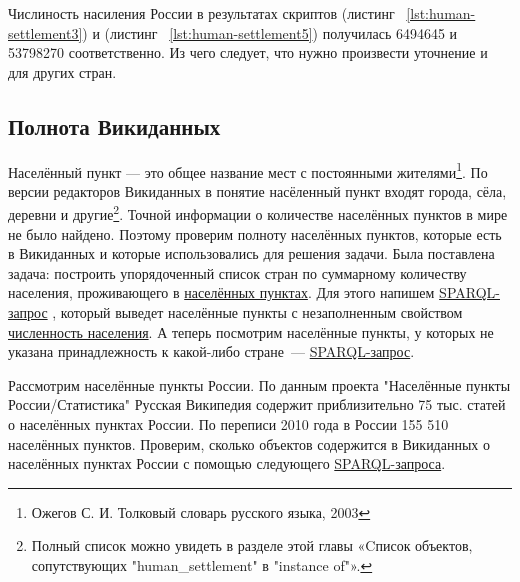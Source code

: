 Числиность насиления России в результатах скриптов (листинг ~\protect\ref{lst:human-settlement3}) и (листинг ~\protect\ref{lst:human-settlement5}) получилась \num{6494645} и \num{53798270} соответственно. Из чего следует, что нужно произвести уточнение и для других стран.

 


\subsection{Полнота Викиданных}

Населённый пункт — это общее название мест с постоянными жителями\footnote {Ожегов С. И. Толковый словарь русского языка, 2003}. По версии редакторов Викиданных в понятие насёленный пункт входят города, сёла, деревни и другие\footnote{Полный список можно увидеть в разделе этой главы «Cписок объектов, сопутствующих "human\_settlement" в "instance of"».}.
Точной информации о количестве населённых пунктов в мире не было найдено. Поэтому проверим полноту населённых пунктов, которые есть в Викиданных и которые использовались для решения задачи. Была поставлена задача: построить упорядоченный список стран по суммарному количеству населения, проживающего в \href{http://www.wikidata.org/entity/Q486972}{населённых пунктах}. Для этого напишем \href{https://w.wiki/4FUz}{SPARQL-запрос} \footnotemark, который выведет населённые пункты с незаполненным свойством \href{http://www.wikidata.org/entity/P1082}{численность населения}. 
А теперь посмотрим населённые пункты, у которых не указана принадлежность к какой-либо стране~--- \href{https://w.wiki/4FV8}{SPARQL-запрос}\footnotemark.


Рассмотрим населённые пункты России. По данным проекта "Населённые пункты России/Статистика" Русская Википедия содержит приблизительно 75 тыс. статей о населённых пунктах России. По переписи 2010 года в России 155 510 населённых пунктов. Проверим, сколько объектов содержится в Викиданных о населённых пунктах России с помощью следующего \href{https://w.wiki/4FVE}{SPARQL-запроса}\protect\footnotemark. 

